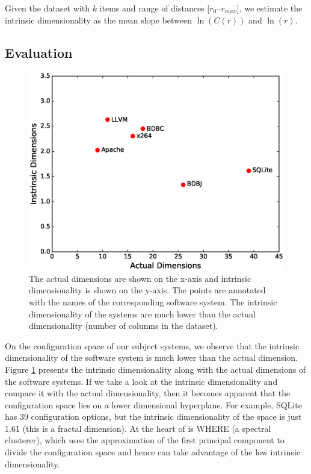 Given the dataset with $k$ items and range of distances [$r_0$--$r_{max}$], we estimate the intrinsic dimensionality as the mean slope between $\ln(C(r))$ and $\ln(r)$.

\subsection{Evaluation}
\begin{figure}[t]
\includegraphics[width=0.9\columnwidth]{Figures/underlying_dimension}
\caption{The actual dimensions are shown on the x-axis and intrinsic dimensionality is shown on the y-axis. The points are annotated with the names of the corresponding software system. The intrinsic dimensionality of the systems are much lower than the actual dimensionality (number of columns in the dataset).}
\label{fig:underlying_d}
\end{figure}
On the configuration space of our subject systems, we observe that {the intrinsic dimensionality of the software system is much lower than the actual dimension}. Figure \ref{fig:underlying_d} presents the intrinsic dimensionality along with the actual dimensions of the software systems. If we take a look at the intrinsic dimensionality and compare it with the actual dimensionality, then it becomes apparent that the configuration space lies on a lower dimensional hyperplane. For example, SQLite has 39 configuration options, but the intrinsic dimensionality of the space is just 1.61 (this is a fractal dimension). At the heart of \what is WHERE (a spectral clusterer), which uses the approximation of the first principal component to divide the configuration space and hence can take advantage of the low intrinsic dimensionality. 

